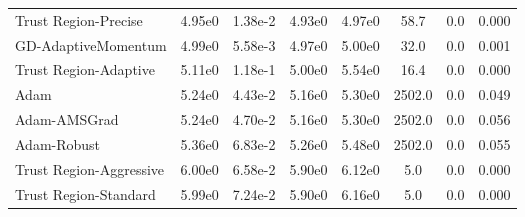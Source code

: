 \documentclass{article}
\begin{document}
\begin{table}[htbp]
{\begin{tabular}{p{2.5cm}*{7}{c}}
Trust Region-Precise & 4.95e0 & 1.38e-2 & 4.93e0 & 4.97e0 & 58.7 & 0.0 & 0.000 \\
GD-AdaptiveMomentum & 4.99e0 & 5.58e-3 & 4.97e0 & 5.00e0 & 32.0 & 0.0 & 0.001 \\
Trust Region-Adaptive & 5.11e0 & 1.18e-1 & 5.00e0 & 5.54e0 & 16.4 & 0.0 & 0.000 \\
Adam & 5.24e0 & 4.43e-2 & 5.16e0 & 5.30e0 & 2502.0 & 0.0 & 0.049 \\
Adam-AMSGrad & 5.24e0 & 4.70e-2 & 5.16e0 & 5.30e0 & 2502.0 & 0.0 & 0.056 \\
Adam-Robust & 5.36e0 & 6.83e-2 & 5.26e0 & 5.48e0 & 2502.0 & 0.0 & 0.055 \\
Trust Region-Aggressive & 6.00e0 & 6.58e-2 & 5.90e0 & 6.12e0 & 5.0 & 0.0 & 0.000 \\
Trust Region-Standard & 5.99e0 & 7.24e-2 & 5.90e0 & 6.16e0 & 5.0 & 0.0 & 0.000 \\
\bottomrule
\end{tabular}
}
\end{table}
\end{document}
